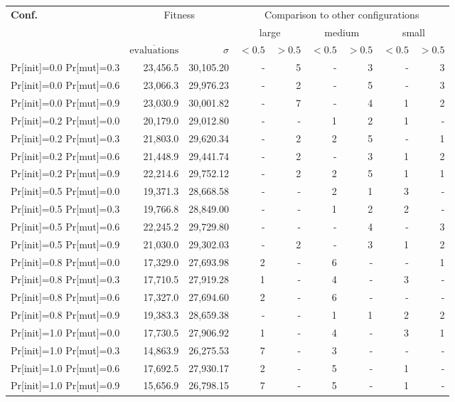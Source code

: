 \begin{tabular}{ l r r | rr | rr | rr }
\hline 
\textbf{Conf.} & \multicolumn{2}{c|}{Fitness} & \multicolumn{6}{c}{Comparison to other configurations} \\ 
  &   &   & \multicolumn{2}{c}{large} & \multicolumn{2}{c}{medium} & \multicolumn{2}{c}{small} \\ 
  & $\overline{\text{evaluations}}$ & $\sigma$ & $<0.5$ & $>0.5$ & $<0.5$ & $>0.5$ & $<0.5$ & $>0.5$ \\ 
\hline 
Pr[init]=0.0 Pr[mut]=0.3 & 23,456.5 & 30,105.20& -& 5& -& 3& -& 3 \\ 
Pr[init]=0.0 Pr[mut]=0.6 & 23,066.3 & 29,976.23& -& 2& -& 5& -& 3 \\ 
Pr[init]=0.0 Pr[mut]=0.9 & 23,030.9 & 30,001.82& -& 7& -& 4& 1& 2 \\ 
Pr[init]=0.2 Pr[mut]=0.0 & 20,179.0 & 29,012.80& -& -& 1& 2& 1& - \\ 
Pr[init]=0.2 Pr[mut]=0.3 & 21,803.0 & 29,620.34& -& 2& 2& 5& -& 1 \\ 
Pr[init]=0.2 Pr[mut]=0.6 & 21,448.9 & 29,441.74& -& 2& -& 3& 1& 2 \\ 
Pr[init]=0.2 Pr[mut]=0.9 & 22,214.6 & 29,752.12& -& 2& 2& 5& 1& 1 \\ 
Pr[init]=0.5 Pr[mut]=0.0 & 19,371.3 & 28,668.58& -& -& 2& 1& 3& - \\ 
Pr[init]=0.5 Pr[mut]=0.3 & 19,766.8 & 28,849.00& -& -& 1& 2& 2& - \\ 
Pr[init]=0.5 Pr[mut]=0.6 & 22,245.2 & 29,729.80& -& -& -& 4& -& 3 \\ 
Pr[init]=0.5 Pr[mut]=0.9 & 21,030.0 & 29,302.03& -& 2& -& 3& 1& 2 \\ 
Pr[init]=0.8 Pr[mut]=0.0 & 17,329.0 & 27,693.98& 2& -& 6& -& -& 1 \\ 
Pr[init]=0.8 Pr[mut]=0.3 & 17,710.5 & 27,919.28& 1& -& 4& -& 3& - \\ 
Pr[init]=0.8 Pr[mut]=0.6 & 17,327.0 & 27,694.60& 2& -& 6& -& -& - \\ 
Pr[init]=0.8 Pr[mut]=0.9 & 19,383.3 & 28,659.38& -& -& 1& 1& 2& 2 \\ 
Pr[init]=1.0 Pr[mut]=0.0 & 17,730.5 & 27,906.92& 1& -& 4& -& 3& 1 \\ 
Pr[init]=1.0 Pr[mut]=0.3 & 14,863.9 & 26,275.53& 7& -& 3& -& -& - \\ 
Pr[init]=1.0 Pr[mut]=0.6 & 17,692.5 & 27,930.17& 2& -& 5& -& 1& - \\ 
Pr[init]=1.0 Pr[mut]=0.9 & 15,656.9 & 26,798.15& 7& -& 5& -& 1& - \\ 
\hline 
\end{tabular}